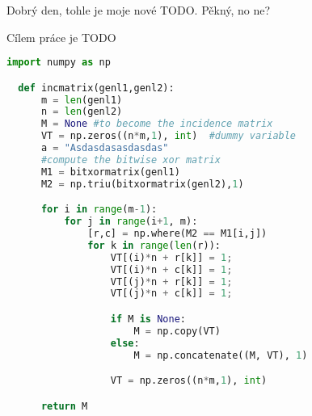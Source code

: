 
Dobrý den, tohle je moje nové TODO. Pěkný, no ne?  
\cite{christen_data_matching_2012}

Cílem práce je TODO



\begin{lstlisting}[language=Python]
  import numpy as np

  def incmatrix(genl1,genl2):
      m = len(genl1)
      n = len(genl2)
      M = None #to become the incidence matrix
      VT = np.zeros((n*m,1), int)  #dummy variable
      a = "Asdasdasasdasdas"
      #compute the bitwise xor matrix
      M1 = bitxormatrix(genl1)
      M2 = np.triu(bitxormatrix(genl2),1)

      for i in range(m-1):
          for j in range(i+1, m):
              [r,c] = np.where(M2 == M1[i,j])
              for k in range(len(r)):
                  VT[(i)*n + r[k]] = 1;
                  VT[(i)*n + c[k]] = 1;
                  VT[(j)*n + r[k]] = 1;
                  VT[(j)*n + c[k]] = 1;

                  if M is None:
                      M = np.copy(VT)
                  else:
                      M = np.concatenate((M, VT), 1)

                  VT = np.zeros((n*m,1), int)

      return M
  \end{lstlisting}
